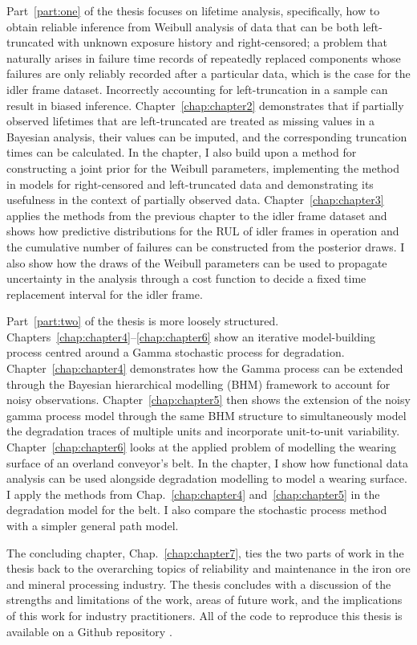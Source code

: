 Part~\ref{part:one} of the thesis focuses on lifetime analysis, specifically, how to obtain reliable inference from Weibull analysis of data that can be both left-truncated with unknown exposure history and right-censored; a problem that naturally arises in failure time records of repeatedly replaced components whose failures are only reliably recorded after a particular data, which is the case for the idler frame dataset. Incorrectly accounting for left-truncation in a sample can result in biased inference. Chapter~\ref{chap:chapter2} demonstrates that if partially observed lifetimes that are left-truncated are treated as missing values in a Bayesian analysis, their values can be imputed, and the corresponding truncation times can be calculated. In the chapter, I also build upon a method for constructing a joint prior for the Weibull parameters, implementing the method in models for right-censored and left-truncated data and demonstrating its usefulness in the context of partially observed data. Chapter~\ref{chap:chapter3} applies the methods from the previous chapter to the idler frame dataset and shows how predictive distributions for the RUL of idler frames in operation and the cumulative number of failures can be constructed from the posterior draws. I also show how the draws of the Weibull parameters can be used to propagate uncertainty in the analysis through a cost function to decide a fixed time replacement interval for the idler frame.

Part~\ref{part:two} of the thesis is more loosely structured. Chapters~\ref{chap:chapter4}--\ref{chap:chapter6} show an iterative model-building process centred around a Gamma stochastic process for degradation. Chapter~\ref{chap:chapter4} demonstrates how the Gamma process can be extended through the Bayesian hierarchical modelling (BHM) framework to account for noisy observations. Chapter~\ref{chap:chapter5} then shows the extension of the noisy gamma process model through the same BHM structure to simultaneously model the degradation traces of multiple units and incorporate unit-to-unit variability. Chapter~\ref{chap:chapter6} looks at the applied problem of modelling the wearing surface of an overland conveyor's belt. In the chapter, I show how functional data analysis can be used alongside degradation modelling to model a wearing surface. I apply the methods from Chap.~\ref{chap:chapter4} and~\ref{chap:chapter5} in the degradation model for the belt. I also compare the stochastic process method with a simpler general path model.

The concluding chapter, Chap.~\ref{chap:chapter7}, ties the two parts of work in the thesis back to the overarching topics of reliability and maintenance in the iron ore and mineral processing industry. The thesis concludes with a discussion of the strengths and limitations of the work, areas of future work, and the implications of this work for industry practitioners. All of the code to reproduce this thesis is available on a Github repository \citep{code_repo}.